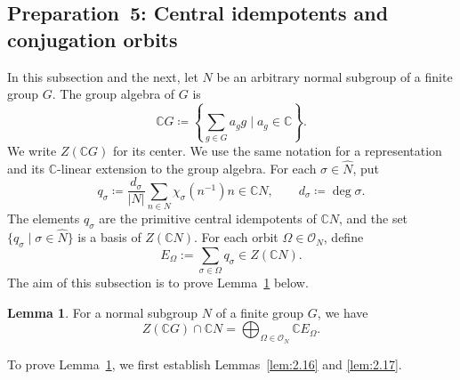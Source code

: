 \documentclass[12pt,a4paper]{article}
\theoremstyle{definition}
\newtheorem{lem}[definition]{Lemma}
\numberwithin{definition}{section}
\begin{document}
\subsection{Preparation~5: Central idempotents and conjugation orbits}\label{sec:2.5}
In this subsection and the next, let $N$ be an arbitrary normal subgroup of a finite group $G$.
The group algebra of $G$ is
\[
\mathbb{C}G \coloneqq \left\{ \sum_{g \in G} a_{g} g \mid a_{g} \in \mathbb{C} \right\}.
\]
We write $Z(\mathbb{C}G)$ for its center.
We use the same notation for a representation and its $\mathbb C$-linear extension to the group algebra.
For each $\sigma \in \widehat{N}$, put
\[
q_{\sigma} \coloneqq \dfrac{d_{\sigma}}{|N|} \sum_{n \in N} \chi_{\sigma}(n^{-1}) n \in \mathbb{C}N, \qquad d_{\sigma} \coloneqq \deg{\sigma}.
\]
The elements $q_{\sigma}$ are the primitive central idempotents of $\mathbb{C}N$,
and the set $\{ q_{\sigma} \mid \sigma \in \widehat{N} \}$ is a basis of $Z(\mathbb{C}N)$.
For each orbit $\Omega \in \mathcal{O}_{N}$, define
\[
E_{\Omega} := \sum_{\sigma \in \Omega} q_{\sigma} \in Z(\mathbb{C}N).
\]
The aim of this subsection is to prove Lemma~\ref{lem:2.15} below.

\begin{lem}\label{lem:2.15}
For a normal subgroup $N$ of a finite group $G$, we have
\[
Z(\mathbb{C}G) \cap \mathbb{C}N = \bigoplus_{\Omega \in \mathcal{O}_{N}} \mathbb{C} E_{\Omega}.
\]
\end{lem}

To prove Lemma~\ref{lem:2.15}, we first establish Lemmas~\ref{lem:2.16} and \ref{lem:2.17}.
\end{document}
